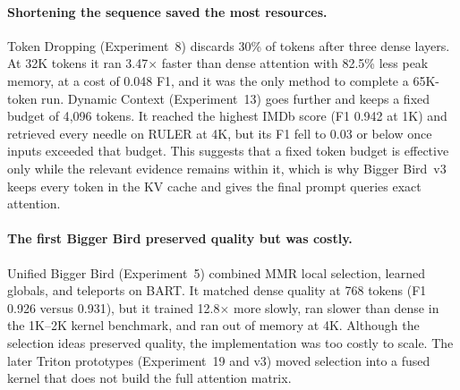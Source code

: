 \documentclass[11pt]{article}
\begin{document}
\paragraph{Shortening the sequence saved the most resources.}
Token Dropping (Experiment~8) discards 30\% of tokens after three dense
layers. At 32K tokens it ran 3.47$\times$ faster than dense attention with
82.5\% less peak memory, at a cost of 0.048 F1, and it was the only method to
complete a 65K-token run. Dynamic Context (Experiment~13) goes further and
keeps a fixed budget of 4{,}096 tokens. It reached the highest IMDb score (F1
0.942 at 1K) and retrieved every needle on RULER at 4K, but its F1 fell to
0.03 or below once inputs exceeded that budget. This suggests that a fixed
token budget is effective only while the relevant evidence remains within it,
which is why Bigger Bird~v3 keeps every token in the KV cache and gives the
final prompt queries exact attention.

\paragraph{The first Bigger Bird preserved quality but was costly.}
Unified Bigger Bird (Experiment~5) combined MMR local selection, learned
globals, and teleports on BART. It matched dense quality at 768 tokens (F1
0.926 versus 0.931), but it trained 12.8$\times$ more slowly, ran slower than
dense in the 1K--2K kernel benchmark, and ran out of memory at 4K. Although
the selection ideas preserved quality, the implementation was too costly to
scale. The later Triton prototypes (Experiment~19 and v3) moved selection
into a fused kernel that does not build the full attention matrix.
\end{document}
